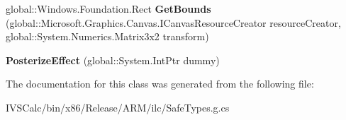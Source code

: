 \begin{DoxyCompactItemize}
\item 
\mbox{\label{class_microsoft_1_1_graphics_1_1_canvas_1_1_effects_1_1_posterize_effect_a4ee2f237bc1b5167fcc5df95e29965cc}} 
global\+::\+Windows.\+Foundation.\+Rect {\bfseries Get\+Bounds} (global\+::\+Microsoft.\+Graphics.\+Canvas.\+I\+Canvas\+Resource\+Creator resource\+Creator, global\+::\+System.\+Numerics.\+Matrix3x2 transform)
\item 
\mbox{\label{class_microsoft_1_1_graphics_1_1_canvas_1_1_effects_1_1_posterize_effect_adb521c0c91dea5df611cb2166a550e59}} 
{\bfseries Posterize\+Effect} (global\+::\+System.\+Int\+Ptr dummy)
\end{DoxyCompactItemize}


The documentation for this class was generated from the following file\+:\begin{DoxyCompactItemize}
\item 
I\+V\+S\+Calc/bin/x86/\+Release/\+A\+R\+M/ilc/Safe\+Types.\+g.\+cs\end{DoxyCompactItemize}
